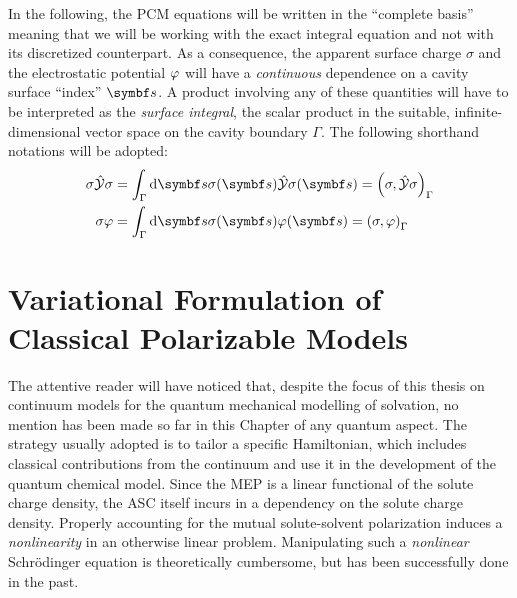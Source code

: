 In the following, the \acrshort{PCM} equations will be written in the
\enquote{complete basis} meaning that we will be working with the exact integral
equation and not with its discretized counterpart.
As a consequence, the apparent surface charge $\sigma$ and
the electrostatic potential $\varphi$ will have a \emph{continuous}
dependence on a cavity surface \enquote{index} $\vect{s}$.
A product involving any of these quantities will have to be
interpreted as the \emph{surface integral}, \ie the scalar product in
the suitable, infinite-dimensional vector space on the cavity boundary
$\Gamma$.
The following shorthand notations will be adopted:
\begin{equation}
  \begin{aligned}
  \sigma\PCM\sigma &=
  \int_\Gamma\diff\vect{s}\sigma(\vect{s})\PCM\sigma(\vect{s})
  =
  \scalprod{\sigma}{\PCM\sigma} \\
  \sigma\esp &=
  \int_\Gamma\diff\vect{s}\sigma(\vect{s})\esp(\vect{s})
  =
  \scalprod{\sigma}{\esp}
  \end{aligned}
\end{equation}

\section[Variational Formulation of Classical Polarizable Models]{
Variational Formulation of Classical Polarizable Models}
\label{sec:variational}

The attentive reader will have noticed that, despite the focus of this
thesis on continuum models for the quantum mechanical modelling of
solvation, no mention has been made so far in this Chapter of any
quantum aspect.
The strategy usually adopted is to tailor a specific Hamiltonian, which
includes classical contributions from the continuum and use it in the
development of the quantum chemical model.
Since the \acrshort{MEP} is a linear functional of the solute charge density,
the \acrshort{ASC} itself incurs in a dependency on the solute charge
density.
Properly accounting for the mutual solute-solvent polarization induces a
\emph{nonlinearity} in an otherwise linear problem.
Manipulating such a \emph{nonlinear} Schr\"{o}dinger equation is
theoretically cumbersome,\autocite{Sanhueza1979-bp, Heimsoeth1990-ki}
but has been successfully done in the past.\autocite{Tomasi2005-vm}

